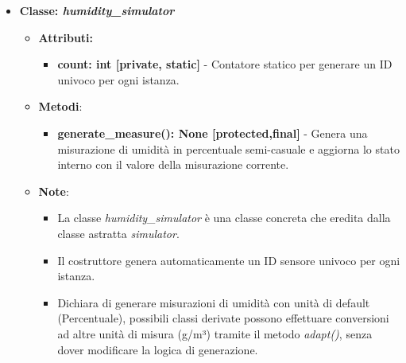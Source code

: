 \begin{itemize}
    \item{\textbf{Classe: \textit{humidity\_simulator}}}
    \begin{itemize}
        \item\textbf{Attributi:}
        \begin{itemize}
            \item \textbf{count: int [private, static]} - Contatore statico per generare un ID univoco per ogni istanza.
        \end{itemize}
        \item \textbf{Metodi}: 
        \begin{itemize}
            \item \textbf{generate\_measure(): None [protected,final]} - Genera una misurazione di umidità in percentuale semi-casuale e aggiorna lo stato interno con il valore della misurazione corrente.
        \end{itemize}
        \item \textbf{Note}:
        \begin{itemize}
        \item La classe \textit{humidity\_simulator} è una classe concreta che eredita dalla classe astratta \textit{simulator}.
        \item Il costruttore genera automaticamente un ID sensore univoco per ogni istanza.
        \item Dichiara di generare misurazioni di umidità con unità di default (Percentuale), possibili classi derivate possono effettuare conversioni ad altre unità di misura (g/m³) tramite il metodo \textit{adapt()}, senza dover modificare la logica di generazione.
        \end{itemize}
    \end{itemize}


\end{itemize}
